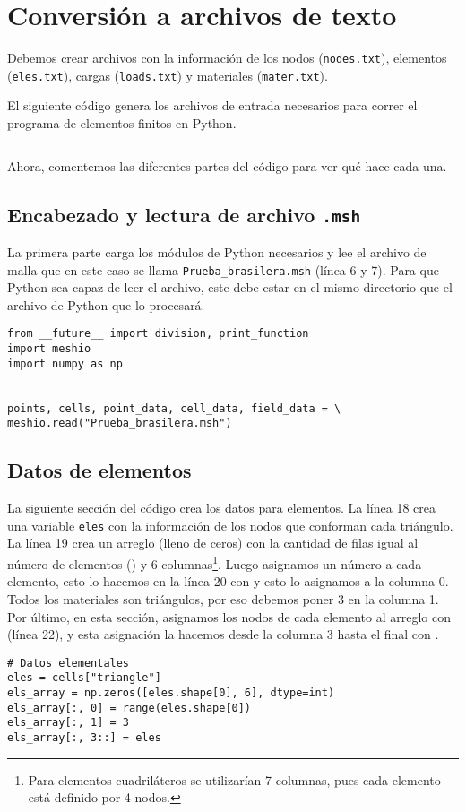 \section{Conversión a archivos de texto}
Debemos crear archivos con la información de los nodos (\texttt{nodes.txt}), elementos (\texttt{eles.txt}), cargas (\texttt{loads.txt}) y materiales (\texttt{mater.txt}).

El siguiente código genera los archivos de entrada necesarios para correr el programa de elementos finitos en Python.
\inputminted[mathescape,
linenos,
numbersep=5pt,
gobble=0,
frame=lines,
framesep=2mm]{python}{src/tutorial/Prueba_brasilera_input.py}


Ahora, comentemos las diferentes partes del código para ver qué hace cada una.

\subsection{Encabezado y lectura de archivo \texttt{.msh}}
La primera parte carga los módulos de Python necesarios y lee el archivo de malla que en este caso se llama \texttt{Prueba\_brasilera.msh} (línea 6 y 7). Para que Python sea capaz de leer el archivo, este debe estar en el mismo directorio que el archivo de Python que lo procesará.
\begin{verbatim}
from __future__ import division, print_function
import meshio
import numpy as np


points, cells, point_data, cell_data, field_data = \
meshio.read("Prueba_brasilera.msh")
\end{verbatim}

\subsection{Datos de elementos}
La siguiente sección del código crea los datos para elementos. La línea 18 crea una variable \texttt{eles} con la información de los nodos que conforman cada triángulo. La línea 19 crea un arreglo (lleno de ceros) con la cantidad de filas igual al número de elementos () y 6 columnas\footnote{Para elementos cuadriláteros se utilizarían 7 columnas, pues cada elemento está definido por 4 nodos.}. Luego asignamos un número a cada elemento, esto lo hacemos en la línea 20 con  y esto lo asignamos a la columna 0. Todos los materiales son triángulos, por eso debemos poner 3 en la columna 1. Por último, en esta sección, asignamos los nodos de cada elemento al arreglo con  (línea 22), y esta asignación la hacemos desde la columna 3 hasta el final con .
\begin{verbatim}
# Datos elementales
eles = cells["triangle"]
els_array = np.zeros([eles.shape[0], 6], dtype=int)
els_array[:, 0] = range(eles.shape[0])
els_array[:, 1] = 3
els_array[:, 3::] = eles
\end{verbatim}

